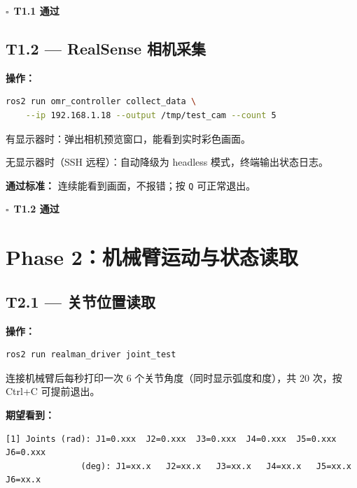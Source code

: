 \documentclass[12pt,a4paper,fontset=ubuntu]{ctexart}
\newcommand{\chkbox}{$\square$}
\newcommand{\passcriteria}[1]{%
  \textbf{通过标准：} #1%
}
\begin{document}
\begin{center}\chkbox\ \textbf{T1.1 通过}\end{center}


\subsection{T1.2 — RealSense 相机采集}

\textbf{操作：}

\begin{lstlisting}[language=bash]
ros2 run omr_controller collect_data \
    --ip 192.168.1.18 --output /tmp/test_cam --count 5
\end{lstlisting}

\begin{infobox}
有显示器时：弹出相机预览窗口，能看到实时彩色画面。

无显示器时（SSH 远程）：自动降级为 headless 模式，终端输出状态日志。
\end{infobox}

\passcriteria{
  连续能看到画面，不报错；按 \texttt{Q} 可正常退出。
}

\begin{center}\chkbox\ \textbf{T1.2 通过}\end{center}

\section{Phase 2：机械臂运动与状态读取}

\subsection{T2.1 — 关节位置读取}

\textbf{操作：}

\begin{lstlisting}[language=bash]
ros2 run realman_driver joint_test
\end{lstlisting}

\begin{infobox}
连接机械臂后每秒打印一次 6 个关节角度（同时显示弧度和度），共 20 次，按 Ctrl+C 可提前退出。
\end{infobox}

\textbf{期望看到：}

\begin{lstlisting}[]
[1] Joints (rad): J1=0.xxx  J2=0.xxx  J3=0.xxx  J4=0.xxx  J5=0.xxx  J6=0.xxx
               (deg): J1=xx.x   J2=xx.x   J3=xx.x   J4=xx.x   J5=xx.x   J6=xx.x
\end{lstlisting}
\end{document}
